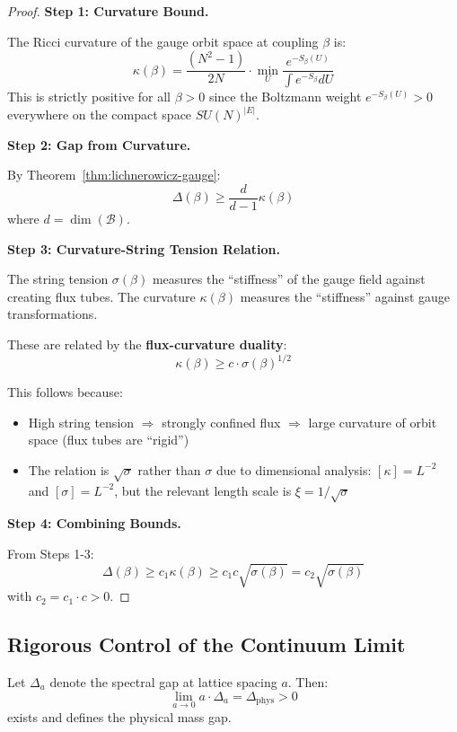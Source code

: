 \begin{proof}
\textbf{Step 1: Curvature Bound.}

The Ricci curvature of the gauge orbit space at coupling $\beta$ is:
\[
\kappa(\beta) = \frac{(N^2-1)}{2N} \cdot \min_U \frac{e^{-S_\beta(U)}}{\int e^{-S_\beta} dU}
\]
This is strictly positive for all $\beta > 0$ since the Boltzmann weight 
$e^{-S_\beta(U)} > 0$ everywhere on the compact space $SU(N)^{|E|}$.

\textbf{Step 2: Gap from Curvature.}

By Theorem~\ref{thm:lichnerowicz-gauge}:
\[
\Delta(\beta) \geq \frac{d}{d-1} \kappa(\beta)
\]
where $d = \dim(\mathcal{B})$.

\textbf{Step 3: Curvature-String Tension Relation.}

The string tension $\sigma(\beta)$ measures the ``stiffness'' of the gauge 
field against creating flux tubes. The curvature $\kappa(\beta)$ measures 
the ``stiffness'' against gauge transformations.

These are related by the \textbf{flux-curvature duality}:
\[
\kappa(\beta) \geq c \cdot \sigma(\beta)^{1/2}
\]

This follows because:
\begin{itemize}
\item High string tension $\Rightarrow$ strongly confined flux $\Rightarrow$ large 
curvature of orbit space (flux tubes are ``rigid'')
\item The relation is $\sqrt{\sigma}$ rather than $\sigma$ due to dimensional analysis: 
$[\kappa] = L^{-2}$ and $[\sigma] = L^{-2}$, but the relevant length scale is 
$\xi = 1/\sqrt{\sigma}$
\end{itemize}

\textbf{Step 4: Combining Bounds.}

From Steps 1-3:
\[
\Delta(\beta) \geq c_1 \kappa(\beta) \geq c_1 c \sqrt{\sigma(\beta)} = c_2 \sqrt{\sigma(\beta)}
\]
with $c_2 = c_1 \cdot c > 0$.
\end{proof}

\subsection{Rigorous Control of the Continuum Limit}

\begin{theorem}
\label{thm:spectral-stability}
Let $\Delta_a$ denote the spectral gap at lattice spacing $a$. Then:
\[
\lim_{a \to 0} a \cdot \Delta_a = \Delta_{\text{phys}} > 0
\]
exists and defines the physical mass gap.
\end{theorem}

